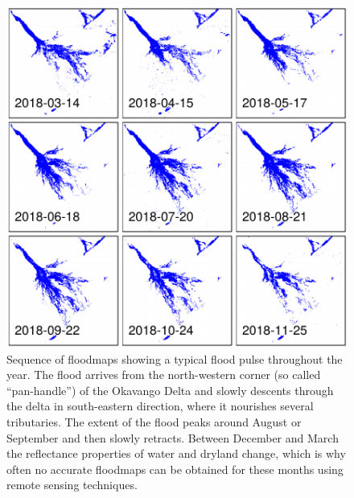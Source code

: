 \documentclass[abstract=on,10pt,a4paper,bibliography=totocnumbered]{scrartcl}
\begin{document}
\begin{figure}[h]
  \begin{center}
    \includegraphics[width = \textwidth]{99_FloodPulse.pdf}
    \caption{Sequence of floodmaps showing a typical flood pulse throughout the
    year. The flood arrives from the north-western corner (so called
    ``pan-handle'') of the Okavango Delta and slowly descents through the delta
    in south-eastern direction, where it nourishes several tributaries. The
    extent of the flood peaks around August or September and then slowly
    retracts. Between December and March the reflectance properties of water and
    dryland change, which is why often no accurate floodmaps can be obtained for
    these months using remote sensing techniques.}
    \label{FloodPulse}
  \end{center}
\end{figure}

\newpage
\end{document}
